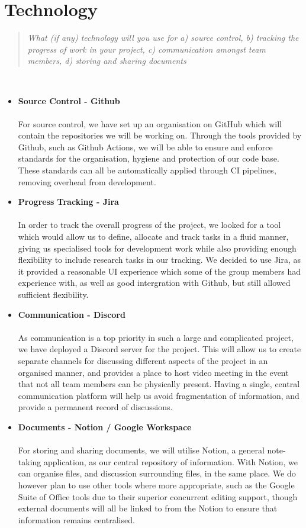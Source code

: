 \documentclass{report}
\newcommand{\teamq}[1]{\begin{quote}
    \large\textit{#1}
\end{quote}}
\begin{document}
\section*{Technology}
\teamq{What (if any) technology will you use for a) source control, b) tracking the progress of work in your project, c) communication amongst team members, d) storing and sharing documents}
\\
\begin{itemize}
    \item \textbf{Source Control - Github}\\
    \\For source control, we have set up an organisation on GitHub which will contain the repositories we will be working on. Through the tools provided by Github, such as Github Actions, we will be able to ensure and enforce standards for the organisation, hygiene and protection of our code base. These standards can all be automatically applied through CI pipelines, removing overhead from development.
    
    \item \textbf{Progress Tracking - Jira}\\
    \\In order to track the overall progress of the project, we looked for a tool which would allow us to define, allocate and track tasks in a fluid manner, giving us specialised tools for development work while also providing enough flexibility to include research tasks in our tracking. We decided to use Jira, as it provided a reasonable UI experience which some of the group members had experience with, as well as good intergration with Github, but still allowed sufficient flexibility.
    
    \item \textbf{Communication - Discord}\\
    \\As communication is a top priority in such a large and complicated project, we have deployed a Discord server for the project. This will allow us to create separate channels for discussing different aspects of the project in an organised manner, and provides a place to host video meeting in the event that not all team members can be physically present. Having a single, central communication platform will help us avoid fragmentation of information, and provide a permanent record of discussions.
    
    \item \textbf{Documents - Notion / Google Workspace}\\
    \\For storing and sharing documents, we will utilise Notion, a general note-taking application, as our central repository of information. With Notion, we can organise files, and discussion surrounding files, in the same place. We do however plan to use other tools where more appropriate, such as the Google Suite of Office tools due to their superior concurrent editing support, though external documents will all be linked to from the Notion to ensure that information remains centralised.
\end{itemize}
\end{document}
